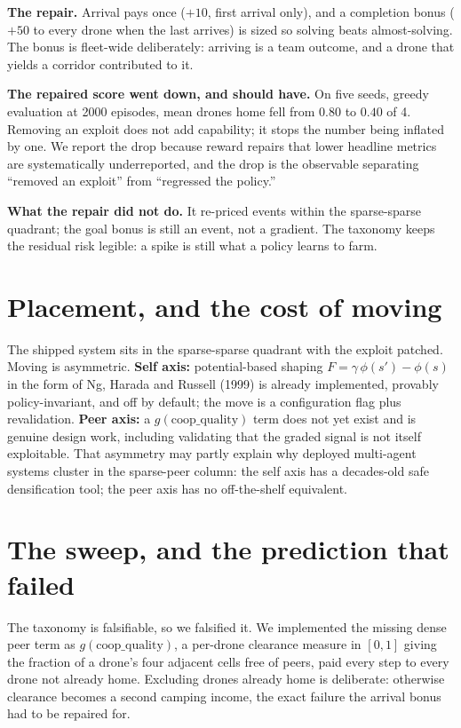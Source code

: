 \documentclass[11pt]{article}
\begin{document}
\textbf{The repair.} Arrival pays once ($+10$, first arrival only), and a completion bonus ($+50$ to every drone when the last arrives) is sized so solving beats almost-solving. The bonus is fleet-wide deliberately: arriving is a team outcome, and a drone that yields a corridor contributed to it.

\textbf{The repaired score went down, and should have.} On five seeds, greedy evaluation at 2000 episodes, mean drones home fell from $0.80$ to $0.40$ of 4. Removing an exploit does not add capability; it stops the number being inflated by one. We report the drop because reward repairs that lower headline metrics are systematically underreported, and the drop is the observable separating ``removed an exploit'' from ``regressed the policy.''

\textbf{What the repair did not do.} It re-priced events within the sparse-sparse quadrant; the goal bonus is still an event, not a gradient. The taxonomy keeps the residual risk legible: a spike is still what a policy learns to farm.

\section{Placement, and the cost of moving}
The shipped system sits in the sparse-sparse quadrant with the exploit patched. Moving is asymmetric. \textbf{Self axis:} potential-based shaping $F = \gamma\,\phi(s') - \phi(s)$ in the form of Ng, Harada and Russell (1999) is already implemented, provably policy-invariant, and off by default; the move is a configuration flag plus revalidation. \textbf{Peer axis:} a $g(\text{coop\_quality})$ term does not yet exist and is genuine design work, including validating that the graded signal is not itself exploitable. That asymmetry may partly explain why deployed multi-agent systems cluster in the sparse-peer column: the self axis has a decades-old safe densification tool; the peer axis has no off-the-shelf equivalent.

\section{The sweep, and the prediction that failed}\label{sec:exp}
The taxonomy is falsifiable, so we falsified it. We implemented the missing dense peer term as $g(\text{coop\_quality})$, a per-drone clearance measure in $[0,1]$ giving the fraction of a drone's four adjacent cells free of peers, paid every step to every drone not already home. Excluding drones already home is deliberate: otherwise clearance becomes a second camping income, the exact failure the arrival bonus had to be repaired for.
\end{document}
